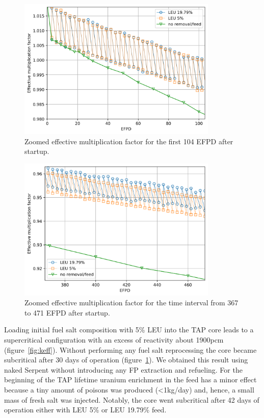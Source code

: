 \documentclass[12pt]{article} %
\begin{document}
\begin{figure}[htp!] %
  \centering
		  \includegraphics[width=0.85\textwidth]{keff_zoomed_1.png}
	  \vspace{-0.25in}
  \caption{Zoomed effective multiplication factor for the first 104 EFPD 
  after startup.}
  \label{fig:keff-zoomed}
\end{figure}
\begin{figure}[htp!] %
  \centering
		  \includegraphics[width=0.85\textwidth]{keff_zoomed_2.png}
	 \vspace{-0.25in}
  \caption{Zoomed effective multiplication factor for the time interval 
  from 367 to 471 EFPD after startup.}
  \label{fig:keff-zoomed-2}
\end{figure}

Loading initial fuel salt composition with 5\% \gls{LEU} into the \gls{TAP} 
core leads to a supercritical configuration with an excess of reactivity about 
1900pcm (figure~\ref{fig:keff}). Without performing any fuel salt reprocessing 
the core became subcritical after 30 days of operation (figure~\ref{fig:keff-zoomed}). 
We obtained this result using naked Serpent without introducing any \gls{FP} extraction 
and refueling. For the beginning of the \gls{TAP} lifetime uranium enrichment in the 
feed has a minor effect because a tiny amount of poisons was produced (<1kg/day) and, 
hence, a small mass of fresh salt was injected. Notably, the core went subcritical after 
42 days of operation either with \gls{LEU} 5\% or \gls{LEU} 19.79\% feed.
\end{document}
